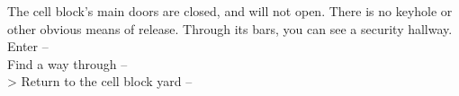 The cell block’s main doors are closed, and will not open. There is no keyhole or other obvious means of release. Through its bars, you can see a security hallway.\\

 Enter -- \\
 Find a way through -- \\
> Return to the cell block yard -- 